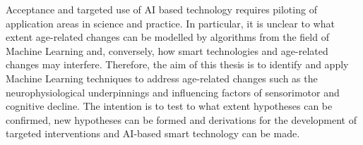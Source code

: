 Acceptance and targeted use of AI based technology requires piloting of application areas in science and practice. In particular, it is unclear to what extent age-related changes can be modelled by algorithms from the field of Machine Learning and, conversely, how smart technologies and age-related changes may interfere. Therefore, the aim of this thesis is to identify and apply Machine Learning techniques to address age-related changes such as the neurophysiological underpinnings and influencing factors of sensorimotor and cognitive decline. The intention is to test to what extent hypotheses can be confirmed, new hypotheses can be formed and derivations for the development of targeted interventions and AI-based smart technology can be made.


